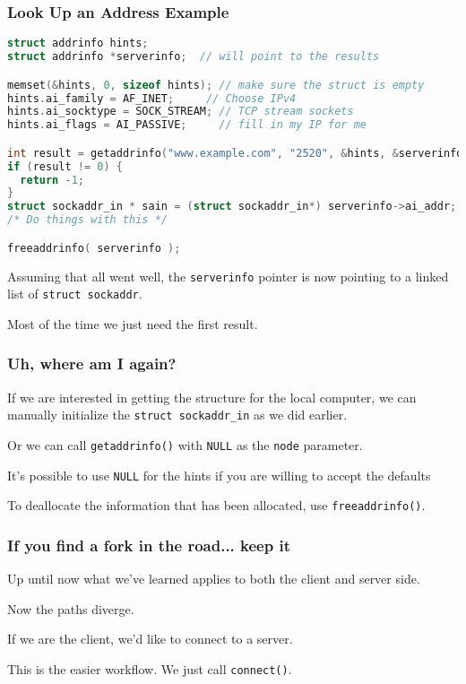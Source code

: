 \begin{frame}[fragile]
	\frametitle{Look Up an Address Example}

	\begin{lstlisting}[language=C]
struct addrinfo hints;
struct addrinfo *serverinfo;  // will point to the results

memset(&hints, 0, sizeof hints); // make sure the struct is empty
hints.ai_family = AF_INET;     // Choose IPv4
hints.ai_socktype = SOCK_STREAM; // TCP stream sockets
hints.ai_flags = AI_PASSIVE;     // fill in my IP for me

int result = getaddrinfo("www.example.com", "2520", &hints, &serverinfo);
if (result != 0) {
  return -1;
}
struct sockaddr_in * sain = (struct sockaddr_in*) serverinfo->ai_addr;
/* Do things with this */

freeaddrinfo( serverinfo );
\end{lstlisting}


	Assuming that all went well, the \texttt{serverinfo} pointer is now pointing to a linked list of \texttt{struct sockaddr}.

	Most of the time we just need the first result.
\end{frame}


\begin{frame}
	\frametitle{Uh, where am I again?}

	If we are interested in getting the structure for the local computer, we can manually initialize the \texttt{struct sockaddr\_in} as we did earlier.

	Or we can call \texttt{getaddrinfo()} with \texttt{NULL} as the \texttt{node} parameter.

	It's possible to use \texttt{NULL} for the hints if you are willing to accept the defaults

	To deallocate the information that has been allocated, use \texttt{freeaddrinfo()}.
\end{frame}


\begin{frame}
	\frametitle{If you find a fork in the road... keep it}

	Up until now what we've learned applies to both the client and server side.

	Now the paths diverge.

	If we are the client, we'd like to connect to a server.

	This is the easier workflow. We just call \texttt{connect()}.

\end{frame}


